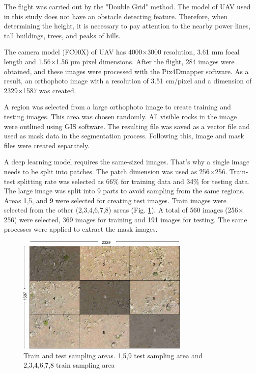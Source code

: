 \documentclass[a4paper,fleqn]{cas-sc}
\begin{document}
The flight was carried out by the "Double Grid" method. The model of UAV used in this study does not have an obstacle detecting feature. Therefore, when determining the height, it is necessary to pay attention to the nearby power lines, tall buildings, trees, and peaks of hills.

The camera model (FC00X) of UAV has 4000$\times$3000 resolution, 3.61 mm focal length and 1.56$\times$1.56 µm pixel dimensions. After the flight, 284 images were obtained, and these images were processed with the Pix4Dmapper software. As a result, an orthophoto image with a resolution of 3.51 cm/pixel and a dimension of 2329$\times$1587 was created.

A region was selected from a large orthophoto image to create training and testing images. This area was chosen randomly. All visible rocks in the image were outlined using GIS software. The resulting file was saved as a vector file and used as mask data in the segmentation process. Following this, image and mask files were created separately.

A deep learning model requires the same-sized images. That's why a single image needs to be split into patches. The patch dimension was used as 256$\times$256. Train-test splitting rate was selected as 66\% for training data and 34\% for testing data. The large image was split into 9 parts to avoid sampling from the same regions. Areas 1,5, and 9 were selected for creating test images. Train images were selected from the other (2,3,4,6,7,8) areas (Fig. \ref{fig:Figure4}). A total of 560 images (256$\times$256) were selected, 369 images for training and 191 images for testing. The same processes were applied to extract the mask images.
\begin{figure}
	\centering
	\includegraphics[width=0.75\textwidth]{figures/fig4.jpg}
	\caption{ Train and test sampling areas. 1,5,9 test sampling area and 2,3,4,6,7,8 train sampling area}
	\label{fig:Figure4}
\end{figure}
\end{document}
